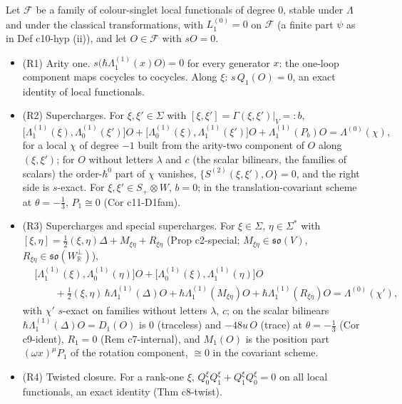 \begin{proposition}
\label{prop:qs-rel}
Let $\mathcal F$ be a family of colour-singlet local functionals of degree $0$, stable under $\Lambda$ and under the classical transformations, with $L_1^{(0)}=0$ on $\mathcal F$ (a finite part $\psi$ as in Def c10-hyp (ii)), and let $O\in\mathcal F$ with $sO=0$.
\begin{itemize}
\item (R1) Arity one. $s\big(\hbar\Lambda^{(1)}_1(x)O\big)=0$ for every generator $x$: the one-loop component maps cocycles to cocycles. Along $\xi$: $s\,Q_1(O)=0$, an exact identity of local functionals.
\item (R2) Supercharges. For $\xi,\xi'\in\Sigma$ with $[\xi,\xi']=\Gamma(\xi,\xi')|_V=:b$,
\[
\big[\Lambda^{(1)}_1(\xi),\Lambda^{(1)}_0(\xi')\big]O+\big[\Lambda^{(1)}_0(\xi),\Lambda^{(1)}_1(\xi')\big]O+\Lambda^{(1)}_1(P_b)O=\Lambda^{(0)}(\chi),
\]
for a local $\chi$ of degree $-1$ built from the arity-two component of $O$ along $(\xi,\xi')$; for $O$ without letters $\lambda$ and $c$ (the scalar bilinears, the families of scalars) the order-$\hbar^0$ part of $\chi$ vanishes, $\{S^{(2)}(\xi,\xi'),O\}=0$, and the right side is $s$-exact. For $\xi,\xi'\in S_+\otimes W$, $b=0$; in the translation-covariant scheme at $\theta=-\tfrac13$, $P_1\cong0$ (Cor c11-D1fam).
\item (R3) Supercharges and special supercharges. For $\xi\in\Sigma$, $\eta\in\Sigma^*$ with $[\xi,\eta]=\tfrac12(\xi,\eta)\Delta+M_{\xi\eta}+R_{\xi\eta}$ (Prop c2-special; $M_{\xi\eta}\in\mathfrak{so}(V)$, $R_{\xi\eta}\in\mathfrak{so}(W^\perp_{\mathbb R})$),
\[
\begin{aligned}
&\big[\Lambda^{(1)}_1(\xi),\Lambda^{(1)}_0(\eta)\big]O+\big[\Lambda^{(1)}_0(\xi),\Lambda^{(1)}_1(\eta)\big]O\\
&\qquad+\tfrac12(\xi,\eta)\,\hbar\Lambda^{(1)}_1(\Delta)O+\hbar\Lambda^{(1)}_1(M_{\xi\eta})O+\hbar\Lambda^{(1)}_1(R_{\xi\eta})O=\Lambda^{(0)}(\chi'),
\end{aligned}
\]
with $\chi'$ $s$-exact on families without letters $\lambda$, $c$; on the scalar bilinears $\hbar\Lambda^{(1)}_1(\Delta)O=D_1(O)$ is $0$ (traceless) and $-48u\,O$ (trace) at $\theta=-\tfrac13$ (Cor c9-ident), $R_1=0$ (Rem c7-internal), and $M_1(O)$ is the position part $(\omega x)^\mu P_1$ of the rotation component, $\cong0$ in the covariant scheme.
\item (R4) Twisted closure. For a rank-one $\xi$, $Q^\xi_0Q^\xi_1+Q^\xi_1Q^\xi_0=0$ on all local functionals, an exact identity (Thm c8-twist).

\end{itemize}
\end{proposition}
